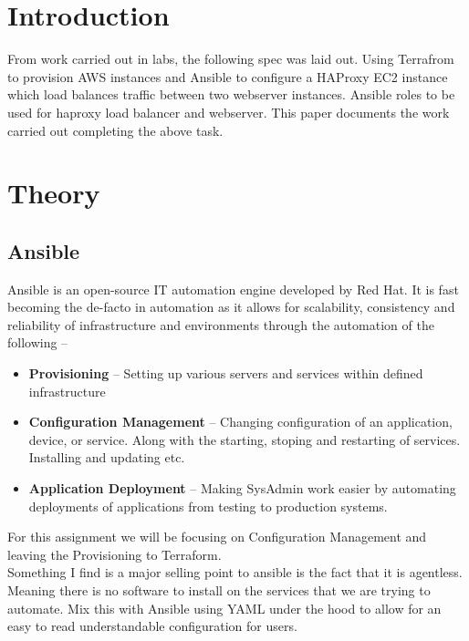 \section{Introduction}
From work carried out in labs, the following spec was laid out. Using Terrafrom to provision AWS instances and Ansible to configure a HAProxy EC2 instance which load balances traffic between two webserver instances. Ansible roles to be used for haproxy load balancer and webserver. This paper documents the work carried out completing the above task.

\section{Theory}
\subsection{Ansible}
Ansible is an open-source IT automation engine developed by Red Hat. It is fast becoming the de-facto in automation as it allows for scalability, consistency and reliability of infrastructure and environments through the automation of the following -- 
\begin{itemize}
    \item \textbf{Provisioning} -- Setting up various servers and services within defined infrastructure
    \item \textbf{Configuration Management } -- Changing configuration of an application, device, or service. Along with the starting, stoping and restarting of services. Installing and updating etc.
    \item \textbf{Application Deployment } -- Making SysAdmin work easier by automating deployments of applications from testing to production systems.
\end{itemize}
For this assignment we will be focusing on Configuration Management and leaving the Provisioning to Terraform.
\\Something I find is a major selling point to ansible is the fact that it is agentless. Meaning there is no software to install on the services that we are trying to automate. Mix this with Ansible using YAML under the hood to allow for an easy to read understandable configuration for users.
